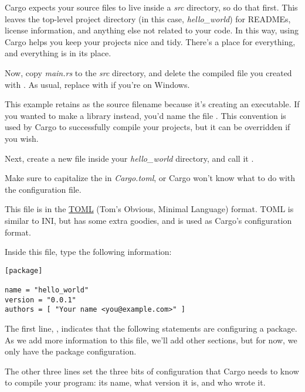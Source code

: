 Cargo expects your source files to live inside a \emph{src} directory, so do that first. This leaves the top-level 
project directory (in this case, \emph{hello\_world}) for READMEs, license information, and anything else not related 
to your code. In this way, using Cargo helps you keep your projects nice and tidy. There's a place for everything, 
and everything is in its place.

\blank

Now, copy \emph{main.rs} to the \emph{src} directory, and delete the compiled file you created with . As usual, 
replace  with  if you're on Windows.

\blank

This example retains  as the source filename because it's creating an executable. If you wanted to make a 
library instead, you'd name the file . This convention is used by Cargo to successfully compile your projects, 
but it can be overridden if you wish.


Next, create a new file inside your \emph{hello\_world} directory, and call it .

\blank

Make sure to capitalize the  in \emph{Cargo.toml}, or Cargo won't know what to do with the configuration file.

\blank

This file is in the \href{https://github.com/toml-lang/toml}{TOML} (Tom's Obvious, Minimal Language) format. TOML is similar 
to INI, but has some extra goodies, and is used as Cargo's configuration format.

\blank

Inside this file, type the following information:

\begin{verbatim}
[package]

name = "hello_world"
version = "0.0.1"
authors = [ "Your name <you@example.com>" ] 
\end{verbatim}

The first line, \code{[package]}, indicates that the following statements are configuring a package. As we add more information 
to this file, we'll add other sections, but for now, we only have the package configuration.

\blank

The other three lines set the three bits of configuration that Cargo needs to know to compile your program: its name, what 
version it is, and who wrote it.

